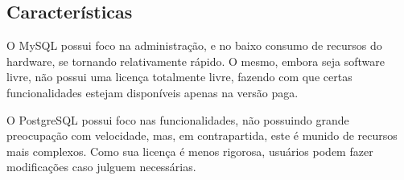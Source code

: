 \documentclass[12pt]{article}
\begin{document}
    \subsection{Características}
         O MySQL possui foco na administração, e no baixo consumo de recursos do hardware, se tornando relativamente rápido. O mesmo, embora seja software livre, não possui uma licença totalmente livre, fazendo com que certas funcionalidades estejam disponíveis apenas na versão paga.
         
         O PostgreSQL possui foco nas funcionalidades, não possuindo grande preocupação com velocidade, mas, em contrapartida, este é munido de recursos mais complexos. Como sua licença é menos rigorosa, usuários podem fazer modificações caso julguem necessárias.  

\nocite{msql:33}
\nocite{postgre:37}
\nocite{postgre2:40}
\nocite{lamp:49}



\end{document}
